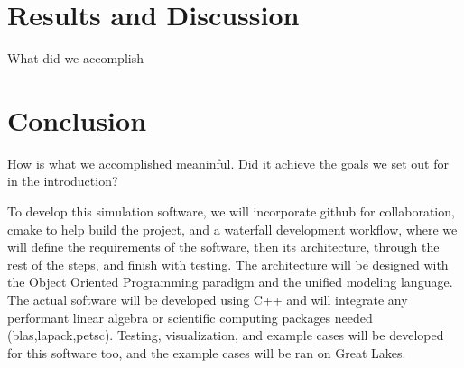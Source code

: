 \documentclass[letterpaper]{article}
\begin{document}
\section*{Results and Discussion}
What did we accomplish
\section*{Conclusion}
How is what we accomplished meaninful. Did it achieve the goals we set out for in the introduction?


To develop this simulation software, we will incorporate github for collaboration, cmake to help build the project, and a waterfall development workflow, where we will define the requirements of the software, then its architecture, through the rest of the steps, and finish with testing. The architecture will be designed with the Object Oriented Programming paradigm and the unified modeling language. The actual software will be developed using C++ and will integrate any performant linear algebra or scientific computing packages needed (blas,lapack,petsc). Testing, visualization, and example cases will be developed for this software too, and the example cases will be ran on Great Lakes.
\end{document}
